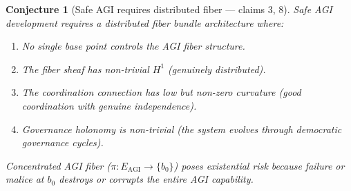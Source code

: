 \documentclass[11pt,a4paper]{article}
\newtheorem{conjecture}[definition]{Conjecture}
\begin{document}
\begin{conjecture}[Safe AGI requires distributed fiber --- claims 3, 8]
Safe AGI development requires a distributed fiber bundle architecture
where:
\begin{enumerate}
  \item No single base point controls the AGI fiber structure.
  \item The fiber sheaf has non-trivial $H^1$ (genuinely distributed).
  \item The coordination connection has low but non-zero curvature
    (good coordination with genuine independence).
  \item Governance holonomy is non-trivial (the system evolves through
    democratic governance cycles).
\end{enumerate}
Concentrated AGI fiber ($\pi : E_{\text{AGI}} \to \{b_0\}$) poses
existential risk because failure or malice at $b_0$ destroys or corrupts
the entire AGI capability.
\end{conjecture}
\end{document}
